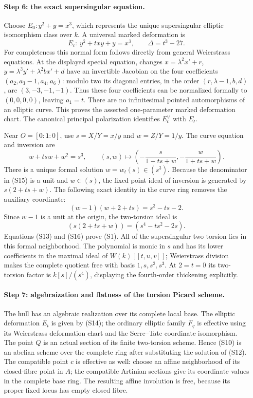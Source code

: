 \paragraph{Step 6: the exact supersingular equation.}
Choose $E_0:y^2+y=x^3$, which represents the unique supersingular
elliptic isomorphism class over $k$. A universal marked deformation
is
\[
                  E_t:\ y^2+txy+y=x^3,
                  \qquad\Delta=t^3-27.                 \tag{S14}
\]
For completeness this normal form follows directly from general
Weierstrass equations. At the displayed special equation, changes
$x=\lambda^2x'+r$, $y=\lambda^3y'+\lambda^2 b x'+d$ have an
invertible Jacobian on the four coefficients
$(a_2,a_3-1,a_4,a_6)$: modulo two its diagonal entries, in the
order $(r,\lambda-1,b,d)$, are $(3,-3,-1,-1)$.
Thus these four coefficients can be normalized formally to
$(0,0,0,0)$, leaving $a_1=t$. There are no infinitesimal pointed
automorphisms of an elliptic curve. This proves the asserted
one-parameter marked deformation chart. The canonical principal
polarization identifies $E_t^\vee$ with $E_t$.

Near $O=[0:1:0]$, use $s=X/Y=x/y$ and $w=Z/Y=1/y$.
The curve equation and inversion are
\[
 w+t s w+w^2=s^3,\qquad
 (s,w)\longmapsto
 \left(-\frac{s}{1+ts+w},-\frac{w}{1+ts+w}\right).       \tag{S15}
\]
There is a unique formal solution $w=w_t(s)\in(s^3)$.
Because the denominator in (S15) is a unit and $w\in(s)$, the
fixed-point ideal of inversion is generated by
$s(2+ts+w)$. The following exact identity in the curve ring removes
the auxiliary coordinate:
\[
 (w-1)(w+2+ts)=s^3-ts-2.
\]
Since $w-1$ is a unit at the origin, the two-torsion ideal is
\[
 (s(2+ts+w))=(s^4-ts^2-2s).                             \tag{S16}
\]
Equations (S13) and (S16) prove (S1). All of the supersingular
two-torsion lies in this formal neighborhood. The polynomial is
monic in $s$ and has its lower coefficients in the maximal ideal of
$W(k)[[t,u,v]]$; Weierstrass division makes the complete quotient
free with basis $1,s,s^2,s^3$. At $2=t=0$ its two-torsion factor is
$k[s]/(s^4)$, displaying the fourth-order thickening explicitly.

\paragraph{Step 7: algebraization and flatness of the torsion Picard scheme.}
The hull has an algebraic realization over its complete local base.
The elliptic deformation $E_t$ is given by (S14); the ordinary
elliptic family $F_q$ is effective using its Weierstrass deformation
chart and the Serre--Tate coordinate isomorphism. The point $Q$ is
an actual section of its finite two-torsion scheme. Hence (S10) is
an abelian scheme over the complete ring after substituting the
solution of (S12). The compatible point $c$ is effective as well:
choose an affine neighborhood of its closed-fibre point in $A$;
the compatible Artinian sections give its coordinate values in the
complete base ring. The resulting affine involution is free, because
its proper fixed locus has empty closed fibre.

